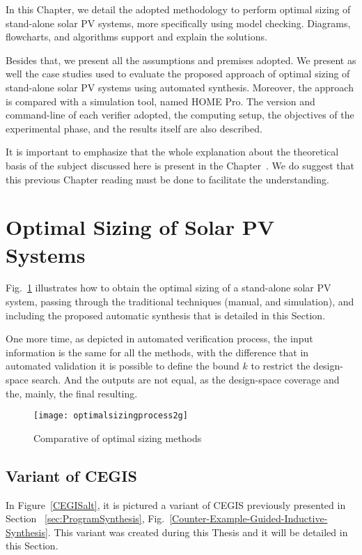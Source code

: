 In this Chapter, we detail the adopted methodology to perform optimal sizing of stand-alone solar PV systems, more specifically using model checking. Diagrams, flowcharts, and algorithms support and explain the solutions.

Besides that, we present all the assumptions and premises adopted. We present as well the case studies used to evaluate the proposed approach of optimal sizing of stand-alone solar PV systems using automated synthesis. Moreover, the approach is compared with a simulation tool, named HOME Pro. The version and command-line of each verifier adopted, the computing setup, the objectives of the experimental phase, and the results itself are also described.

It is important to emphasize that the whole explanation about the theoretical basis of the subject discussed here is present in the Chapter~. We do suggest that this previous Chapter reading must be done to facilitate the understanding.

\section{Optimal Sizing of Solar PV Systems}

Fig.~\ref{fig:optimization} illustrates how to obtain the optimal sizing of a stand-alone solar PV system, passing through the traditional techniques (manual, and simulation), and including the proposed automatic synthesis that is detailed in this Section. 

One more time, as depicted in automated verification process, the input information is the same for all the methods, with the difference that in automated validation it is possible to define the bound $k$ to restrict the design-space search. And the outputs are not equal, as the design-space coverage and the, mainly, the final resulting.

\begin{figure}[h]
\texttt{[image: optimalsizingprocess2g]}
\centering
\caption{Comparative of optimal sizing methods}
\label{fig:optimization}
\end{figure}
 
\subsection{Variant of CEGIS} 

In Figure~\ref{CEGISalt}, it is pictured a variant of CEGIS previously presented in Section ~\ref{sec:ProgramSynthesis}, Fig.~\ref{Counter-Example-Guided-Inductive-Synthesis}. This variant was created during this Thesis and it will be detailed in this Section.

